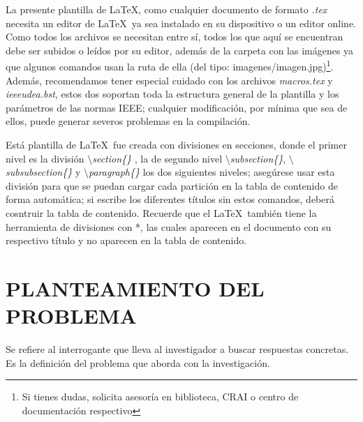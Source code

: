 La presente plantilla de \LaTeX, como cualquier documento de formato \textit{.tex} necesita un editor de \LaTeX\ ya sea instalado en su dispositivo o un editor online. Como todos los archivos se necesitan entre sí, todos los que aquí se encuentran debe ser subidos o leídos por su editor, además de la carpeta con las imágenes ya que algunos comandos usan la ruta de ella (del tipo: imagenes/imagen.jpg)\footnote{Si tienes dudas, solicita asesoría en biblioteca, CRAI o centro de documentación respectivo}. Además, recomendamos tener especial cuidado con los archivos \textit{macros.tex} y \textit{ieeeudea.bst}, estos dos soportan toda la estructura general de la plantilla y los parámetros de las normas IEEE; cualquier modificación, por mínima que sea de ellos, puede generar severos problemas en la compilación.

Está plantilla de \LaTeX \ fue creada con divisiones en secciones, donde el primer nivel es la división \textit{$\setminus$section\{\}} , la de segundo nivel \textit{$\setminus$subsection\{\}}, \textit{$\setminus$subsubsection\{\}} y \textit{$\setminus$paragraph\{\}} los dos siguientes niveles; asegúrese usar esta división para que se puedan cargar cada partición en la tabla de contenido de forma automática; si escribe los diferentes títulos sin estos comandos, deberá cosntruir la tabla de contenido. Recuerde que el \LaTeX\  también tiene la herramienta de divisiones con *, las cuales aparecen en el documento con su respectivo título y no aparecen en la tabla de contenido.

\newpage


\section{PLANTEAMIENTO DEL PROBLEMA}

Se refiere al interrogante que lleva al investigador a buscar respuestas concretas. Es la definición del problema que aborda con la investigación. 

